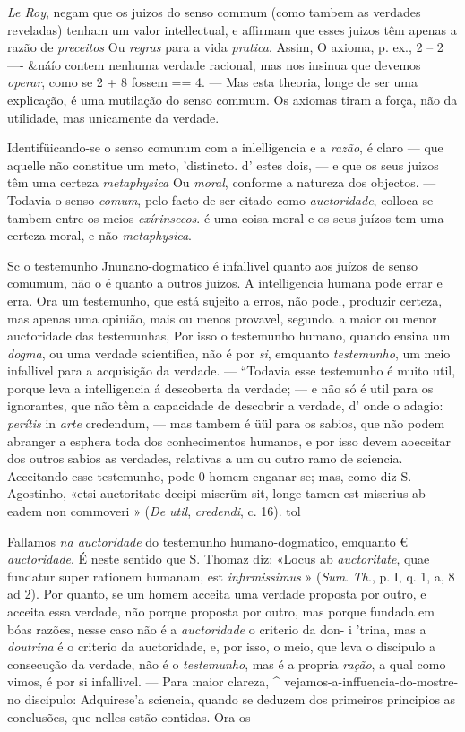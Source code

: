 \emph{Le Roy}, negam que os juizos do senso commum (como tambem as verdades reveladas) tenham um valor intellectual, e affirmam que esses juizos têm apenas a razão de \emph{preceitos} Ou \emph{regras} para a vida \emph{pratica}. Assim, O axioma, p. ex., 2 -- 2---- \&náío contem nenhuma verdade racional, mas nos insinua que devemos \emph{operar}, como se 2 + 8 fossem == 4. --- Mas esta theoria, longe de ser uma explicação, é uma mutilação do senso commum. Os axiomas tiram a força, não da utilidade, mas unicamente da verdade.\par Identifüicando-se o senso comunum com a inlelligencia e a \emph{razão}, é claro --- que aquelle não constitue um meto, 'distincto. d' estes dois, --- e que os seus juizos têm uma certeza \emph{metaphysica} Ou \emph{moral}, conforme a natureza dos objectos. --- Todavia o senso \emph{comum}, pelo facto de ser citado como \emph{auctoridade}, colloca-se tambem entre os meios \emph{exírinsecos}. é uma coisa moral e os seus juízos tem uma certeza moral, e não \emph{metaphysica}.\par *\par Sc o testemunho Jnunano-dogmatico é infallivel quanto aos juízos de senso comumum, não o é quanto a outros juizos. A intelligencia humana pode errar e erra. Ora um testemunho, que está sujeito a erros, não pode., produzir certeza, mas apenas uma opinião, mais ou menos provavel, segundo. a maior ou menor auctoridade das testemunhas, Por isso o testemunho humano, quando ensina um \emph{dogma}, ou uma verdade scientifica, não é por \emph{si}, emquanto \emph{testemunho}, um meio infallivel para a acquisição da verdade. --- “Todavia esse testemunho é muito util, porque leva a intelligencia á descoberta da verdade; --- e não só é util para os ignorantes, que não têm a capacidade de descobrir a verdade, d' onde o adagio: \emph{perítis} in \emph{arte} credendum, --- mas tambem é üül para os sabios, que não podem abranger a esphera toda dos conhecimentos humanos, e por isso devem aoeceitar dos outros sabios as verdades, relativas a um ou outro ramo de sciencia. Acceitando esse testemunho, pode 0 homem enganar se; mas, como diz S. Agostinho, «etsi auctoritate decipi miserüm sit, longe tamen est miserius ab eadem non commoveri » (\emph{De util}, \emph{credendi}, c. 16). tol\par Fallamos \emph{na auctoridade} do testemunho humano-dogmatico, emquanto € \emph{auctoridade}. É neste sentido que S. Thomaz diz: «Locus ab \emph{auctoritate}, quae fundatur super rationem humanam, est \emph{infirmissimus} » (\emph{Sum}. \emph{Th}., p. I, q. 1, a, 8 ad 2). Por quanto, se um homem acceita uma verdade proposta por outro, e acceita essa verdade, não porque proposta por outro, mas porque fundada em bóas razões, nesse caso não é a \emph{auctoridade} o criterio da don- i 'trina, mas a \emph{doutrina} é o criterio da auctoridade, e, por isso, o meio, que leva o discipulo a consecução da verdade, não é o \emph{testemunho}, mas é a propria \emph{ração}, a qual como vimos, é por si infallivel. --- Para maior clareza, \textasciicircum{} vejamos-a-inffuencia-do-mostre-no discipulo: Adquirese'a sciencia, quando se deduzem dos primeiros principios as conclusões, que nelles estão contidas. Ora os 